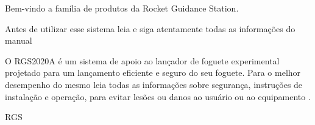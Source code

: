 \documentclass[a4paper,pagesize,12pt,bibtotoc,pointlessnumbers,
normalheadings,DIV=11,twoside=false]{scrbook}
\begin{document}
\begin{center}

	\Large{\parbox{12cm}{
		\begin{raggedright}
		{\Large 
			Bem-vindo a família de produtos da Rocket Guidance Station.
 
			\vspace*{1cm}
			
			Antes de utilizar esse sistema leia e siga atentamente todas as informações do manual
			
			\vspace*{1cm}
			
			O RGS2020A é um sistema de apoio ao lançador de foguete experimental projetado para um lançamento eficiente e seguro do seu foguete. Para o melhor desempenho do mesmo leia todas as informações sobre segurança, instruções de instalação e operação, para evitar lesões ou danos ao usuário ou ao equipamento .
		}
	
		\vspace{.5cm}\hfill{RGS}
		\end{raggedright}
	}
}
\end{center}


\tableofcontents

\newpage


%





%


\end{document}
